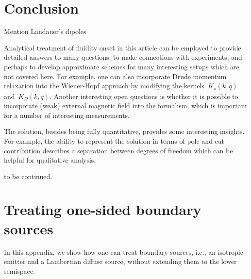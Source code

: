 \documentclass[preprint,aps,eqsecnum, prb]{revtex4-1}
\begin{document}
\section{Conclusion}
\label{sec:conclusion}

Mention Landauer's dipoles

Analytical treatment of fluidity onset in this article can be employed
to provide detailed answers to many questions, to make connections with
experiments, and perhaps to develop approximate schemes for many
interesting setups which are not covered here.
For example, one can also incorporate Drude momentum relaxation into
the Wiener-Hopf approach by modifying the kernels~$K_\rho(k, q)$
and~$K_\Omega(k, q)$. Another  interesting open questions is whether it is
possible to incorporate (weak) external magnetic field into the formalism,
which is important for a number of interesting measurements.

The solution, besides being fully quantitative, provides some interesting
insights. For example, the ability to represent the solution in terms of
pole and cut contribution describes a separation between degrees of freedom
which can be helpful for qualitative analysis.

to be continued.



\appendix

\section{Treating one-sided boundary sources}
\label{sec:app-sources}


In this appendix, we show how one can treat boundary sources,
i.e., an isotropic emitter and a Lambertian diffuse source, without extending
them to the lower semispace.
\end{document}
